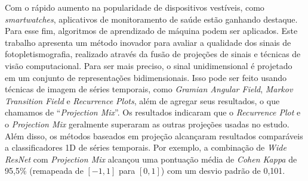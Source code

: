Com o rápido aumento na popularidade de dispositivos vestíveis, como \textit{smartwatches}, aplicativos de monitoramento de saúde estão ganhando destaque. 
Para esse fim, algoritmos de aprendizado de máquina podem ser aplicados. Este trabalho apresenta um método inovador para avaliar a qualidade dos sinais de fotopletismografia, realizado através da fusão de projeções de sinais e técnicas de visão computacional. Para ser mais preciso, o sinal unidimensional é projetado em um conjunto de representações bidimensionais. Isso pode ser feito usando técnicas de imagem de séries temporais, como \textit{Gramian Angular Field}, \textit{Markov Transition Field} e \textit{Recurrence Plots}, além de agregar seus resultados, o que chamamos de ``\textit{Projection Mix}''.  Os resultados indicaram que o \textit{Recurrence Plot} e o \textit{Projection Mix} geralmente superaram as outras projeções usadas no estudo. Além disso, os métodos baseados em projeção alcançaram resultados comparáveis a classificadores 1D de séries temporais. Por exemplo, a combinação de \textit{Wide ResNet} com \textit{Projection Mix} alcançou uma pontuação média de \textit{Cohen Kappa} de 95,5\% (remapeada de $[-1,1]$ para $[0,1]$) com um desvio padrão de 0,101. 
